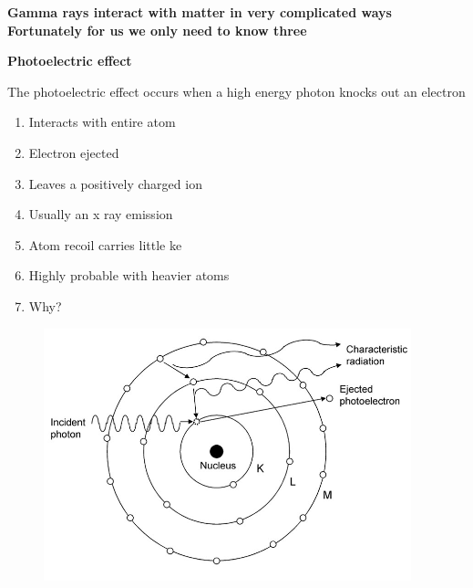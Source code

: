 \documentclass[aspectratio=1610,pdftex,dvipsnames,compress,xcolor={dvipsnames}]{beamer}
\newcommand{\acf}{\acrfull} %
\begin{document}
\begin{frame}[plain]{}
    \centering\Large\textbf{Gamma rays interact with matter in very complicated ways}\\
    \centering\small\textbf{Fortunately for us we only need to know three}
\end{frame}


\begin{frame}[plain]{}
    \centering\LARGE\textbf{Photoelectric effect}
\end{frame}


\addtocounter{framenumber}{-2} 
\begin{frame}{The photoelectric effect occurs when a high energy photon knocks out an electron}
    \begin{enumerate}[series=outerlist,topsep=0pt,itemsep=21pt,leftmargin=*,label=(\arabic*)]
        \item[]Interacts with entire atom
        \item[]Electron ejected
        \item[]Leaves a positively charged ion
        \item[]Usually an x ray emission
        \item[]Atom recoil carries little \acf{ke}
        \item[]Highly probable with heavier atoms
        \item[]Why?
    \end{enumerate}
\end{frame}


\begin{frame}{}
    \begin{figure}
        \centering
        \includegraphics[width=0.95\textwidth]{pe.jpg}
    \end{figure}
\end{frame}
\end{document}
